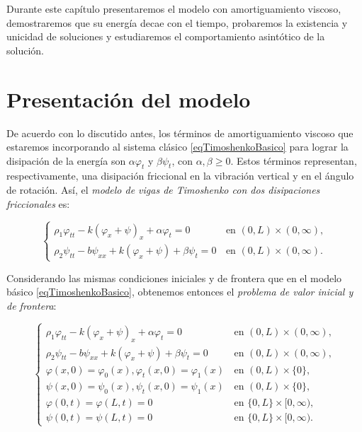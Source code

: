 Durante este capítulo presentaremos el modelo con amortiguamiento viscoso, demostraremos que su energía decae con el tiempo, probaremos la existencia y unicidad de soluciones y estudiaremos el comportamiento asintótico de la solución.

\section{Presentación del modelo}
\label{ch:TimoshenkoFric:section:modelo}

De acuerdo con lo discutido antes, los términos de amortiguamiento viscoso que estaremos incorporando al sistema clásico \eqref{eqTimoshenkoBasico} para lograr la disipación de la energía son $\alpha\varphi_t$ y $\beta\psi_t$, con $\alpha, \beta \geq 0$. Estos términos representan, respectivamente, una disipación friccional en la vibración vertical y  en el ángulo de rotación. Así, el \textit{modelo de vigas de Timoshenko con dos disipaciones friccionales} es:

\begin{equation}
\label{eqTimoshenkoDosDispFracc}
\begin{cases}
\rho_1 \varphi_{tt} - k(\varphi_x + \psi)_x + \alpha\varphi_t = 0 \, &\text{en } (0,L) \times (0, \infty),\\
\rho_2 \psi_{tt} - b\psi_{xx} + k(\varphi_x + \psi) + \beta\psi_t = 0 \, &\text{en } (0,L) \times (0, \infty).
\end{cases}
\end{equation}

Considerando las mismas condiciones iniciales y de frontera que en el modelo básico \eqref{eqTimoshenkoBasico}, obtenemos entonces el \textit{problema de valor inicial y de frontera}:

\begin{equation}
\label{pviTimoshenkoDosDispFracc}
\begin{cases}
\rho_1 \varphi_{tt} - k(\varphi_x + \psi)_x + \alpha\varphi_t = 0 \, &\text{en } (0,L) \times (0, \infty),\\
\rho_2 \psi_{tt} - b\psi_{xx} + k(\varphi_x + \psi) + \beta\psi_t = 0 \, &\text{en } (0,L) \times (0, \infty), \\
\varphi(x,0) = \varphi_0(x), \varphi_t(x,0) = \varphi_1(x) \, &\text{en } (0, L) \times \{0\}, \\
\psi(x,0) = \psi_0(x), \psi_t(x,0) = \psi_1(x) \, &\text{en } (0, L) \times \{0\}, \\
\varphi(0,t) = \varphi(L,t) = 0 \, &\text{en } \{0, L\} \times [0, \infty),\\
\psi(0,t) = \psi(L,t) = 0 \, &\text{en } \{0, L\} \times [0, \infty).
\end{cases}
\end{equation}


